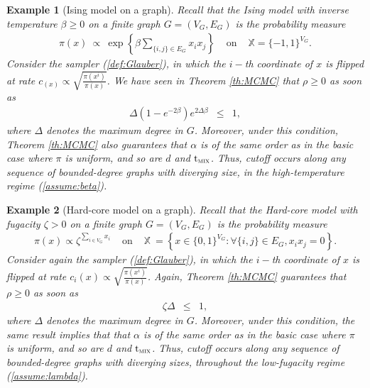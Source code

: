 \documentclass[12pt,final]{article}
\newtheorem{example}{Example}[section]
\numberwithin{equation}{section}
\newcommand{\dX}{\mathbb{X}}
\newcommand{\tmix}{{\rm t}_{\textsc{mix}}}
\begin{document}
\begin{example}[Ising model on a graph]Recall that the Ising model with inverse temperature $\beta\ge 0$ on a finite graph $G=(V_G, E_G)$ is the probability measure
\begin{eqnarray*}
\pi(x) \ \propto \ \exp\left\{\beta \sum_{\{i,j\}\in  E_G}x_ix_j\right\} & \textrm{ on } &  \dX=\{-1,1\}^{V_G}.
\end{eqnarray*}
Consider the sampler (\ref{def:Glauber}), in which the $i-$th coordinate of $x$ is flipped at rate $c_(x)\propto \sqrt{\frac{\pi(x^i)}{\pi(x)}}$. We have seen in Theorem \ref{th:MCMC} that   $\rho\ge 0$ as soon as
\begin{eqnarray}
\label{assume:beta}
\Delta (1-e^{-2\beta})e^{2\Delta \beta} & \le & 1,
\end{eqnarray}
where $\Delta$ denotes the maximum degree in  $G$. Moreover, under this condition, Theorem \ref{th:MCMC} also guarantees that $\alpha$ is of the same order as in the basic case where $\pi$ is uniform, and so are $d$ and $\tmix$. Thus, cutoff occurs along any sequence of bounded-degree graphs with diverging size, in the high-temperature regime (\ref{assume:beta}).
\end{example}

\begin{example}[Hard-core model on a graph]Recall that the Hard-core model with fugacity $\zeta>0$ on a finite graph $G=(V_G, E_G)$ is the probability measure 
\begin{eqnarray*}
\pi(x)  \propto \zeta^{\sum_{i\in V_G}x_i}
& \textrm{ on } & 
\dX \ = \left\{x\in \{0,1\}^{ V_G}\colon \forall \{i,j\}\in E_G, x_ix_j=0\right\}.
\end{eqnarray*}
Consider again the sampler (\ref{def:Glauber}), in which the $i-$th coordinate of $x$ is flipped at rate $c_i(x)\propto\sqrt{\frac{\pi(x^i)}{\pi(x)}}$. Again, Theorem \ref{th:MCMC} guarantees that $\rho\ge 0$ as soon as 
\begin{eqnarray}
\label{assume:lambda}
\zeta\Delta & \le & 1,
\end{eqnarray}
where $\Delta$ denotes the maximum degree in  $G$.  Moreover, under this condition, the same result implies that  that $\alpha$ is of the same order as in the basic case where $\pi$ is uniform, and so are $d$ and $\tmix$. Thus, cutoff occurs along any sequence of bounded-degree graphs with diverging sizes, throughout the low-fugacity regime (\ref{assume:lambda}).
\end{example}



\end{document}
